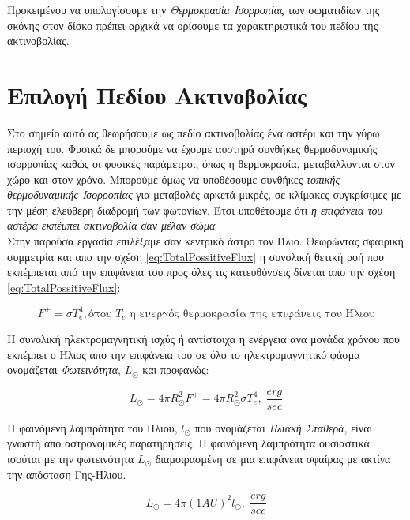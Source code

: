  Προκειμένου να υπολογίσουμε την {\it Θερμοκρασία Ισορροπίας} των σωματιδίων της σκόνης στον δίσκο πρέπει αρχικά να ορίσουμε τα χαρακτηριστικά του πεδίου της ακτινοβολίας. 

\section{Επιλογή Πεδίου Ακτινοβολίας}

Στο σημείο αυτό ας θεωρήσουμε ως πεδίο ακτινοβολίας ένα αστέρι και την γύρω περιοχή του. Φυσικά δε μπορούμε να έχουμε αυστηρά συνθήκες θερμοδυναμικής ισορροπίας καθώς οι φυσικές παράμετροι, όπως η θερμοκρασία, μεταβάλλονται στον χώρο και στον χρόνο. Μπορούμε όμως να υποθέσουμε συνθήκες {\it τοπικής θερμοδυναμικής Ισορροπίας} για μεταβολές αρκετά μικρές, σε κλίμακες συγκρίσιμες με την μέση ελεύθερη διαδρομή των φωτονίων. Έτσι υποθέτουμε ότι {\it η επιφάνεια του αστέρα εκπέμπει ακτινοβολία σαν μέλαν σώμα} \\

Στην παρούσα εργασία επιλέξαμε σαν κεντρικό άστρο τον Ήλιο. Θεωρώντας σφαιρική συμμετρία και απο την σχέση \eqref{eq:TotalPossitiveFlux} η συνολική θετική ροή που εκπέμπεται από την επιφάνεια του προς όλες τις κατευθύνσεις δίνεται απο την σχέση \eqref{eq:TotalPossitiveFlux}:

\begin{equation}\label{eq:SunsTotalPosFLux}
  F^{+} =\sigma T_{e}^4, \text{όπου $T_{e}$ η ενεργός θερμοκρασία της επιφάνεις του Ήλιου}
\end{equation}  

Η συνολική ηλεκτρομαγνητική ισχύς ή αντίστοιχα η ενέργεια ανα μονάδα χρόνου που εκπέμπει ο Ήλιος απο την επιφάνεια του σε όλο το ηλεκτρομαγνητικό φάσμα ονομάζεται {\it Φωτεινότητα}, $L_\odot$ και προφανώς: 

\begin{equation}\label{eq:Brightness}
  L_\odot = 4\pi R_{\odot}^2 F^{+} = 4\pi R_{\odot}^2 \sigma T_{e}^4 , \; \frac{erg}{sec}
\end{equation}

H φαινόμενη λαμπρότητα του Ήλιου, $l_\odot$ που ονομάζεται {\it Ηλιακή Σταθερά}, είναι γνωστή απο αστρονομικές παρατηρήσεις. Η φαινόμενη λαμπρότητα ουσιαστικά ισούται με την φωτεινότητα $L_\odot$ διαμοιρασμένη σε μια επιφάνεια σφαίρας με ακτίνα την απόσταση Γης-Ήλιου.

\begin{equation}\label{eq:Brightness2}
  L_\odot = 4\pi (1 AU)^2 l_\odot,  \; \frac{erg}{sec}
\end{equation}

